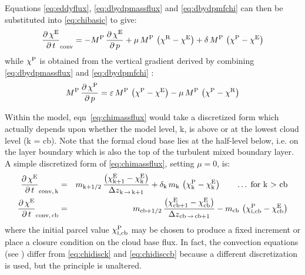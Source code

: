 \documentclass{UMDP_article}
\newcommand{\xsubsup}[2]{\ensuremath{{\chi}_{\rm{#1}}^{\rm{#2}}}}
\newcommand{\lp}{\left(}
\newcommand{\rp}{\right)}
\newcommand{\pardbyd}[2]{\ensuremath{\frac{\partial \, #1}{\partial \, #2}}}
\begin{document}
Equations \ref{eq:eddyflux}, \ref{eq:dbydpmassflux} and
\ref{eq:dbydpmfchi} can then be substituted into \ref{eq:chibasic} to give:
%
\begin{equation}
{\pardbyd{\xsubsup{ }{E}}{t}}_{\rm{conv}} = 
- M^{\rm{P}} \, \pardbyd{\xsubsup{ }{E}}{p} 
+ \mu \, M^{\rm{P}} \, \lp { \xsubsup{ }{R} - \xsubsup{ }{E} } \rp
+ \delta \, M^{\rm{P}} \, \lp { \xsubsup{ }{P} - \xsubsup{ }{E} } \rp
\label{eq:chimassflux} \end{equation}
%
while \xsubsup{}{P} is obtained from the vertical gradient derived by combining
\ref{eq:dbydpmassflux} and \ref{eq:dbydpmfchi} :
%
\begin{equation}
M^{\rm{P}} \, \pardbyd{\xsubsup{ }{P}}{p} =  
\varepsilon \, M^{\rm{P}} \, \lp { \xsubsup{ }{P} - \xsubsup{ }{E} } \rp - 
\mu         \, M^{\rm{P}} \, \lp { \xsubsup{ }{P} - \xsubsup{ }{R} } \rp 
\label{eq:gradchipar} \end{equation}

Within the model, eqn~\ref{eq:chimassflux} would take a discretized form
which actually depends upon whether the model level, k, is above or at the
lowest cloud level (k = cb). Note that the formal cloud base lies at the
half-level below, i.e. on the layer boundary which is also the top of the
turbulent mixed boundary layer. A simple discretized form of
\ref{eq:chimassflux}, setting ${ \mu = 0 }$, is:
%
\begin{eqnarray}
{\pardbyd{\xsubsup{ }{E}}{t}}_{\rm{conv, \, k}} & = & m_{\rm{k+1/2}} \, 
\frac{ \lp {\xsubsup{k+1}{E} - \xsubsup{k}{E}} \rp }
{{\Delta z}_{\rm{k \, \rightarrow \, k+1}}} 
+ {\delta}_{\rm{k}} \, m_{\rm{k}} \, \lp { \xsubsup{k}{P} - \xsubsup{k}{E} } \rp  
\qquad \ldots \; \mbox{for k $>$ cb} \label{eq:chidisck} \\
{\pardbyd{\xsubsup{ }{E}}{t}}_{\rm{conv, \, cb}} & = & m_{\rm{cb+1/2}} \, 
\frac{ \lp {\xsubsup{cb+1}{E} - \xsubsup{cb}{E}} \rp }
{{\Delta z}_{\rm{cb \, \rightarrow \, cb+1}}} 
- m_{\rm{cb}} \, 
\lp { \xsubsup{i,cb}{P} - \xsubsup{cb}{E} } \rp  \label{eq:chidisccb}
\end{eqnarray}
%
where the initial parcel value \xsubsup{i,cb}{P} may be chosen to produce a
fixed increment or place a closure condition on the cloud base flux. In fact,
the convection equations (see ) differ from \ref{eq:chidisck} and
\ref{eq:chidisccb} because a different discretization is used, but the
principle is unaltered.  
\end{document}
